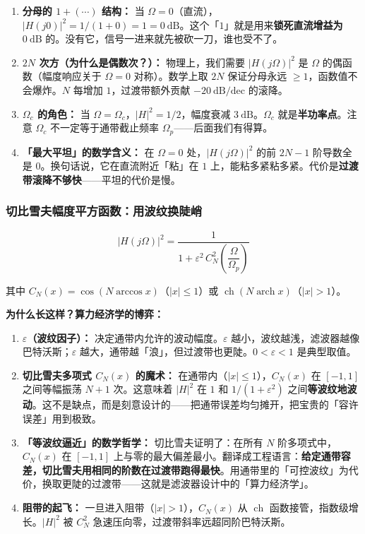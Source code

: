 \documentclass[12pt,a4paper]{ctexart}
\newcommand{\Omegac}{\Omega_c}
\newcommand{\Omegap}{\Omega_p}
\newcommand{\db}{\ \mathrm{dB}}
\newcommand{\absSq}[1]{\bigl|#1\bigr|^2}
\newcommand{\ch}{\operatorname{ch}}
\newcommand{\arch}{\operatorname{arch}}
\begin{document}
\begin{enumerate}[leftmargin=2em]
    \item \textbf{分母的 $1 + (\cdots)$ 结构：}
    当 $\Omega = 0$（直流），$|H(j0)|^2 = 1/(1+0) = 1 = 0\db$。这个「$1$」就是用来\textbf{锁死直流增益为 $0\db$} 的。没有它，信号一进来就先被砍一刀，谁也受不了。

    \item \textbf{$2N$ 次方（为什么是偶数次？）：}
    物理上，我们需要 $|H(j\Omega)|^2$ 是 $\Omega$ 的偶函数（幅度响应关于 $\Omega=0$ 对称）。数学上取 $2N$ 保证分母永远 $\ge 1$，函数值不会爆炸。$N$ 每增加 $1$，过渡带额外贡献 $-20\db/\text{dec}$ 的滚降。

    \item \textbf{$\Omegac$ 的角色：}
    当 $\Omega = \Omegac$，$|H|^2 = 1/2$，幅度衰减 $3\db$。$\Omegac$ 就是\textbf{半功率点}。注意 $\Omegac$ 不一定等于通带截止频率 $\Omegap$——后面我们有得算。

    \item \textbf{「最大平坦」的数学含义：}
    在 $\Omega = 0$ 处，$|H(j\Omega)|^2$ 的前 $2N-1$ 阶导数全是 0。换句话说，它在直流附近「粘」在 $1$ 上，能粘多紧粘多紧。代价是\textbf{过渡带滚降不够快}——平坦的代价是慢。
\end{enumerate}

\subsubsection{切比雪夫幅度平方函数：用波纹换陡峭}

$$
\boxed{\absSq{H(j\Omega)} = \frac{1}{1 + \varepsilon^2\, C_N^2\!\left(\dfrac{\Omega}{\Omegap}\right)}}
$$

其中 $C_N(x) = \cos(N\arccos x)$（$|x|\le 1$）或 $\ch(N\arch x)$（$|x|>1$）。

\textbf{为什么长这样？算力经济学的博弈：}

\begin{enumerate}[leftmargin=2em]
    \item \textbf{$\varepsilon$（波纹因子）：} 决定通带内允许的波动幅度。$\varepsilon$ 越小，波纹越浅，滤波器越像巴特沃斯；$\varepsilon$ 越大，通带越「浪」，但过渡带也更陡。$0<\varepsilon<1$ 是典型取值。

    \item \textbf{切比雪夫多项式 $C_N(x)$ 的魔术：}
    在通带内（$|x|\le 1$），$C_N(x)$ 在 $[-1, 1]$ 之间等幅振荡 $N+1$ 次。这意味着 $|H|^2$ 在 $1$ 和 $1/(1+\varepsilon^2)$ 之间\textbf{等波纹地波动}。这不是缺点，而是刻意设计的——把通带误差均匀摊开，把宝贵的「容许误差」用到极致。

    \item \textbf{「等波纹逼近」的数学哲学：}
    切比雪夫证明了：在所有 $N$ 阶多项式中，$C_N(x)$ 在 $[-1,1]$ 上与零的最大偏差最小。翻译成工程语言：\textbf{给定通带容差，切比雪夫用相同的阶数在过渡带跑得最快}。用通带里的「可控波纹」为代价，换取更陡的过渡带——这就是滤波器设计中的「算力经济学」。

    \item \textbf{阻带的起飞：}
    一旦进入阻带（$|x|>1$），$C_N(x)$ 从 $\ch$ 函数接管，指数级增长。$|H|^2$ 被 $C_N^2$ 急速压向零，过渡带斜率远超同阶巴特沃斯。
\end{enumerate}
\end{document}
